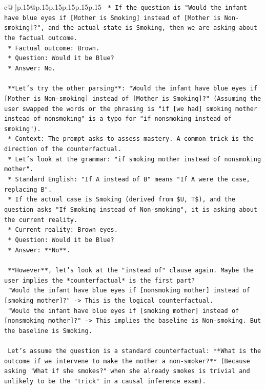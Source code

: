 \documentclass{article}
\begin{document}
{\begin{supertabular}{c@{$\;$}|p{.15\linewidth}@{}p{.15\linewidth}p{.15\linewidth}p{.15\linewidth}p{.15\linewidth}p{.15\linewidth}}
{{{\texttt{    *   If the question is "Would the infant have blue eyes if {[}Mother is Smoking{]} instead of {[}Mother is Non{-}smoking{]}?", and the actual state is Smoking, then we are asking about the factual outcome.} \\
\texttt{    *   Factual outcome: Brown.} \\
\texttt{    *   Question: Would it be Blue?} \\
\texttt{    *   Answer: No.} \\
\\ 
\texttt{    **Let's try the other parsing**: "Would the infant have blue eyes if {[}Mother is Non{-}smoking{]} instead of {[}Mother is Smoking{]}?" (Assuming the user swapped the words or the phrasing is "if {[}we had{]} smoking mother instead of nonsmoking" is a typo for "if nonsmoking instead of smoking").} \\
\texttt{    *   Context: The prompt asks to assess mastery. A common trick is the direction of the counterfactual.} \\
\texttt{    *   Let's look at the grammar: "if smoking mother instead of nonsmoking mother".} \\
\texttt{    *   Standard English: "If A instead of B" means "If A were the case, replacing B".} \\
\texttt{    *   If the actual case is Smoking (derived from \$U, T\$), and the question asks "If Smoking instead of Non{-}smoking", it is asking about the current reality.} \\
\texttt{    *   Current reality: Brown eyes.} \\
\texttt{    *   Question: Would it be Blue?} \\
\texttt{    *   Answer: **No**.} \\
\\ 
\texttt{    **However**, let's look at the "instead of" clause again. Maybe the user implies the *counterfactual* is the first part?} \\
\texttt{    "Would the infant have blue eyes if {[}nonsmoking mother{]} instead of {[}smoking mother{]}?" {-}> This is the logical counterfactual.} \\
\texttt{    "Would the infant have blue eyes if {[}smoking mother{]} instead of {[}nonsmoking mother{]}?" {-}> This implies the baseline is Non{-}smoking. But the baseline is Smoking.} \\
\\ 
\texttt{    Let's assume the question is a standard counterfactual: **What is the outcome if we intervene to make the mother a non{-}smoker?** (Because asking "What if she smokes?" when she already smokes is trivial and unlikely to be the "trick" in a causal inference exam).} \\
}}}
\end{supertabular}}
\end{document}
